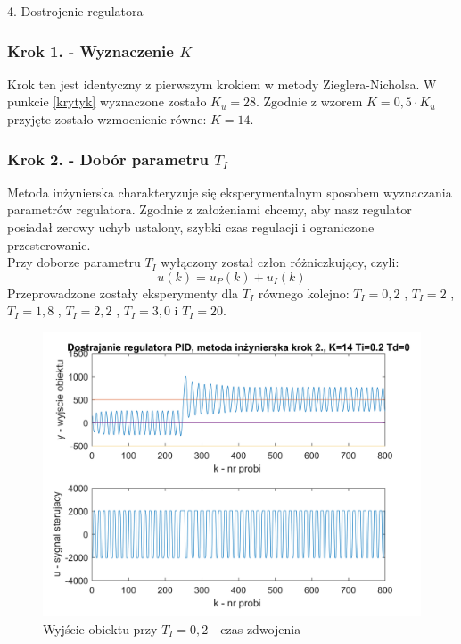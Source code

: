 \documentclass[a4paper, 10pt]{article}
\begin{document}
4. Dostrojenie regulatora\\
\subsubsection{Krok 1. - Wyznaczenie $K$}
Krok ten jest identyczny z pierwszym krokiem w metody Zieglera-Nicholsa. W punkcie \ref{krytyk} wyznaczone zostało $K_{u}=28$. Zgodnie z wzorem $K=0,5 \cdot K_{u}$ przyjęte zostało wzmocnienie równe: $K=14$.
\subsubsection{Krok 2. - Dobór parametru $T_{I}$}

Metoda inżynierska charakteryzuje się eksperymentalnym sposobem wyznaczania parametrów regulatora. Zgodnie z założeniami chcemy, aby nasz regulator posiadał zerowy uchyb ustalony, szybki czas regulacji i ograniczone przesterowanie. \\
Przy doborze parametru $T_{I}$ wyłączony został człon różniczkujący, czyli:\\
\[u(k)=u_{P}(k)+u_{I}(k)\]
Przeprowadzone zostały eksperymenty dla $T_{I}$ równego kolejno: $T_{I}=0,2$ , $T_{I}=2$ , $T_{I}=1,8$ , $T_{I}=2,2$ , $T_{I}=3,0$ i $T_{I}=20$.
\begin{figure}[H]
	\centering
	\includegraphics[width=0.9\linewidth]{MI_ti200}
	\caption{Wyjście obiektu przy $T_{I}=0,2$ - czas zdwojenia}
	\label{fig:MI_ti200}
\end{figure}
\end{document}
